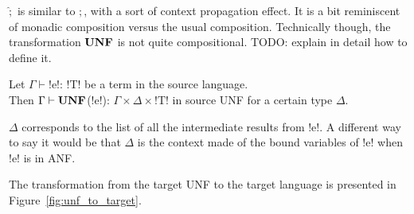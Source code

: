 $\widehat{;}$ is similar to $;$, with a sort of context propagation effect. 
It is a bit reminiscent of monadic composition versus the usual composition.
Technically though, the transformation $\mathbf{UNF}$ is not quite compositional.
TODO: explain in detail how to define it. 

\begin{proposition}
    Let $\Gamma\vdash$!e!: !T! be a term in the source language.\\
    Then $\Gamma \vdash \mathbf{UNF}$(!e!): $\Gamma\times\Delta\times$!T! in source UNF for a certain type $\Delta$. 
\end{proposition}

$\Delta$ corresponds to the list of all the intermediate results from !e!. 
A different way to say it would be that $\Delta$ is the context made of the bound variables of !e! when !e! is in ANF.



The transformation from the target UNF to the target language is presented in Figure~\ref{fig:unf_to_target}.


